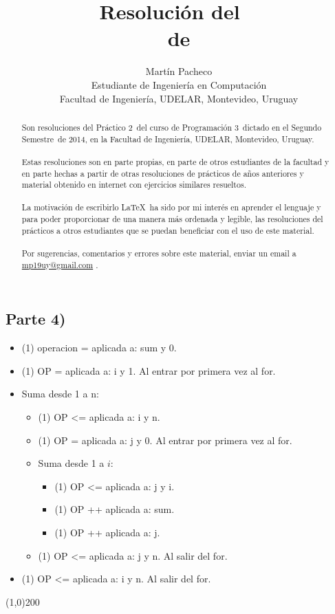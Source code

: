 \documentclass[letterpaper, fleqn]{report}
\title{Resolución del \practico\ \\de \materia}
\author{Martín Pacheco\\Estudiante de Ingeniería en Computación\\Facultad de Ingeniería, UDELAR, Montevideo, Uruguay}
\date{\anio}
\newcommand{\materia}{Programación 3}
\newcommand{\practico}{Práctico 2}
\newcommand{\facultad}{Facultad de Ingeniería}
\newcommand{\semestre}{Segundo Semestre}
\newcommand{\anio}{2014}
\begin{document}
\maketitle
\def\abstractname{ Sobre este documento...}
\begin{abstract}
  Son resoluciones del \practico\ del curso de \materia\ dictado en el \semestre\ de \anio, en la \facultad, UDELAR, Montevideo, Uruguay. 
  \\\\
  Estas resoluciones son en parte propias, en parte de otros estudiantes de la facultad y en parte hechas a partir de otras resoluciones de prácticos de años anteriores y material obtenido en internet con ejercicios similares resueltos.
  \\\\
  La motivación de escribirlo \LaTeX\ ha sido por mi interés en aprender el lenguaje y para poder proporcionar de una manera más ordenada y legible, las resoluciones del prácticos a otros estudiantes que se puedan beneficiar con el uso de este material.
  \\\\
  Por sugerencias, comentarios y errores sobre este material, enviar un email a \href{mailto:mp19uy@gmail.com}{mp19uy@gmail.com} .
\end{abstract}

\pagebreak
\subsection*{Parte 4)}
\begin{itemize}
  \item (1) operacion = aplicada a: sum y 0.
  \item (1) OP = aplicada a: i y 1. Al entrar por primera vez al for.
  \item Suma desde 1 a n:
  \begin{itemize}
    \item (1) OP <= aplicada a: i y n.
    \item (1) OP = aplicada a: j y 0. Al entrar por primera vez al for.
    \item Suma desde 1 a $i$:
      \begin{itemize}
        \item (1) OP <= aplicada a: j y i.
        \item (1) OP ++ aplicada a: sum.
        \item (1) OP ++ aplicada a: j.
      \end{itemize}
    \item (1) OP <= aplicada a: j y n. Al salir del for.
  \end{itemize}
\item (1) OP <= aplicada a: i y n. Al salir del for.
\end{itemize}
\line(1,0){200}
\end{document}
